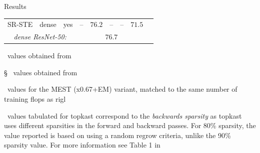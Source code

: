 \documentclass[final]{beamer}
\newlength{\colwidth}
\begin{document}
\begin{frame}[t]
\begin{columns}[t]
\begin{column}{\colwidth}
\begin{block}{Results}
\begin{table}[p]
\begin{threeparttable}
\begin{center}
\begin{tabular}{@{}p{6.0em}p{4.0em}p{5.5em}cccccc@{}}
        SR-STE & dense & yes & -- & $76.2$ & -- & -- & $71.5$ \\ 
        \cmidrule{1-8}
        \multicolumn{3}{c}{\emph{dense ResNet-50:}} & \multicolumn{5}{c}{$76.7$} \\\bottomrule
    \end{tabular}
    \begin{tablenotes}
    \footnotesize
    \item[\textasteriskcentered]~values obtained from \citet{evci_rigging_2021}
    \item[\S]~values obtained from \citet{mostafa_parameter_2019}
    \item[\textdagger]~values for the MEST (x0.67+EM) variant, matched to the same number of training \gls{flops} as \gls{rigl}
    \item[\textdaggerdbl]~values tabulated for \gls{topkast} correspond to the \emph{backwards sparsity} as \gls{topkast} uses different sparsities in the forward and backward passes. For 80\% sparsity, the value reported is based on using a random regrow criteria, unlike the 90\% sparsity value. For more information see Table 1 in \citep{jayakumar_top-kast_2020}
    \end{tablenotes}
    \end{center}
    \end{threeparttable}
  \end{table}



\end{block}
\end{column}
\end{columns}
\end{frame}
\end{document}
